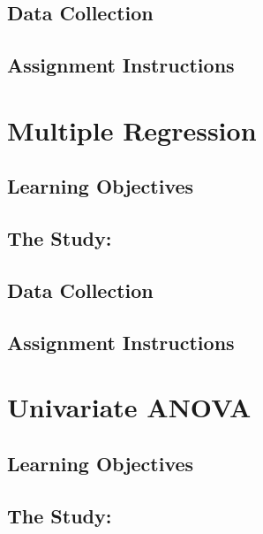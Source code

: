 \documentclass[
]{book}
\begin{document}
\hypertarget{cor-data}{%
\section{Data Collection}\label{cor-data}}

\hypertarget{cor-assignment}{%
\section{Assignment Instructions}\label{cor-assignment}}

\hypertarget{mreg}{%
\chapter{Multiple Regression}\label{mreg}}

\hypertarget{mreg-learning-objectives}{%
\section{Learning Objectives}\label{mreg-learning-objectives}}

\hypertarget{mreg-study}{%
\section{The Study:}\label{mreg-study}}

\hypertarget{mreg-data}{%
\section{Data Collection}\label{mreg-data}}

\hypertarget{mreg-assignment}{%
\section{Assignment Instructions}\label{mreg-assignment}}

\hypertarget{anova}{%
\chapter{Univariate ANOVA}\label{anova}}

\hypertarget{anova-learning-objectives}{%
\section{Learning Objectives}\label{anova-learning-objectives}}

\hypertarget{anova-study}{%
\section{The Study:}\label{anova-study}}
\end{document}
